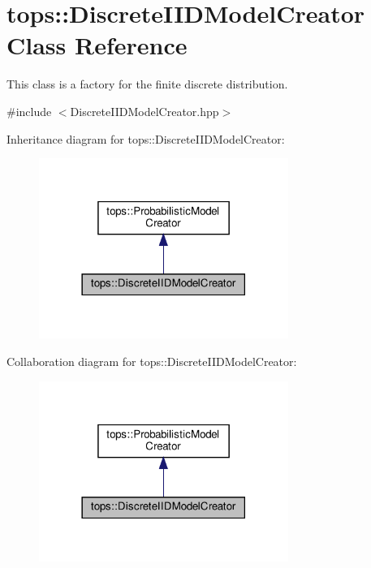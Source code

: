 \hypertarget{classtops_1_1DiscreteIIDModelCreator}{}\section{tops\+:\+:Discrete\+I\+I\+D\+Model\+Creator Class Reference}
\label{classtops_1_1DiscreteIIDModelCreator}


This class is a factory for the finite discrete distribution.  




{\ttfamily \#include $<$Discrete\+I\+I\+D\+Model\+Creator.\+hpp$>$}



Inheritance diagram for tops\+:\+:Discrete\+I\+I\+D\+Model\+Creator\+:
\nopagebreak
\begin{figure}[H]
\begin{center}
\leavevmode
\includegraphics[width=230pt]{classtops_1_1DiscreteIIDModelCreator__inherit__graph}
\end{center}
\end{figure}


Collaboration diagram for tops\+:\+:Discrete\+I\+I\+D\+Model\+Creator\+:
\nopagebreak
\begin{figure}[H]
\begin{center}
\leavevmode
\includegraphics[width=230pt]{classtops_1_1DiscreteIIDModelCreator__coll__graph}
\end{center}
\end{figure}
